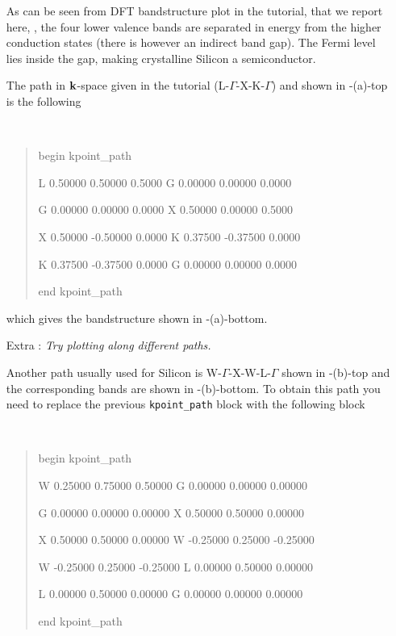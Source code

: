 \begin{enumerate}
	As can be seen from DFT bandstructure plot in the \Wannier{} tutorial, that we report here, \cf{} , the four lower valence bands are separated in energy from the higher conduction states (there is however an indirect band gap). The Fermi level lies inside the gap, making crystalline Silicon a semiconductor.

	The path in $\bfk$-space given in the tutorial (L-$\Gamma$-X-K-$\Gamma$) and shown in -(a)-top is the following
	{\tt
	\begin{quote}
begin kpoint\_path

L 0.50000  \phantom{-}0.50000 0.5000 G \phantom{-}0.00000  0.00000 0.0000

G 0.00000  \phantom{-}0.00000 0.0000 X \phantom{-}0.50000  0.00000 0.5000

X 0.50000 -0.50000 0.0000 K 0.37500 -0.37500 0.0000

K 0.37500 -0.37500 0.0000 G 0.00000  \phantom{-}0.00000 0.0000

end kpoint\_path
	\end{quote}}
	which gives the bandstructure shown in -(a)-bottom. 

	\item[Extra :] {\it Try plotting along different paths.} 

	Another path usually used for Silicon is \mbox{W-$\Gamma$-X-W-L-$\Gamma$} shown in -(b)-top and the corresponding bands are shown in -(b)-bottom. To obtain this path you need to replace the previous {\tt kpoint\_path} block with the following block
	{\tt 
	\begin{quote}
	begin kpoint\_path

	W  \phantom{-}0.25000  0.75000  \phantom{-}0.50000 G  \phantom{-}0.00000   0.00000  \phantom{-}0.00000

	G  \phantom{-}0.00000  0.00000  \phantom{-}0.00000 X  \phantom{-}0.50000  0.50000  \phantom{-}0.00000

	X  \phantom{-}0.50000  0.50000  \phantom{-}0.00000 W -0.25000  0.25000 -0.25000

	W -0.25000  0.25000 -0.25000 L  \phantom{-}0.00000  0.50000  \phantom{-}0.00000

	L  \phantom{-}0.00000  0.50000  \phantom{-}0.00000 G  \phantom{-}0.00000  0.00000  \phantom{-}0.00000

    end kpoint\_path
	\end{quote}} 


\end{enumerate}
